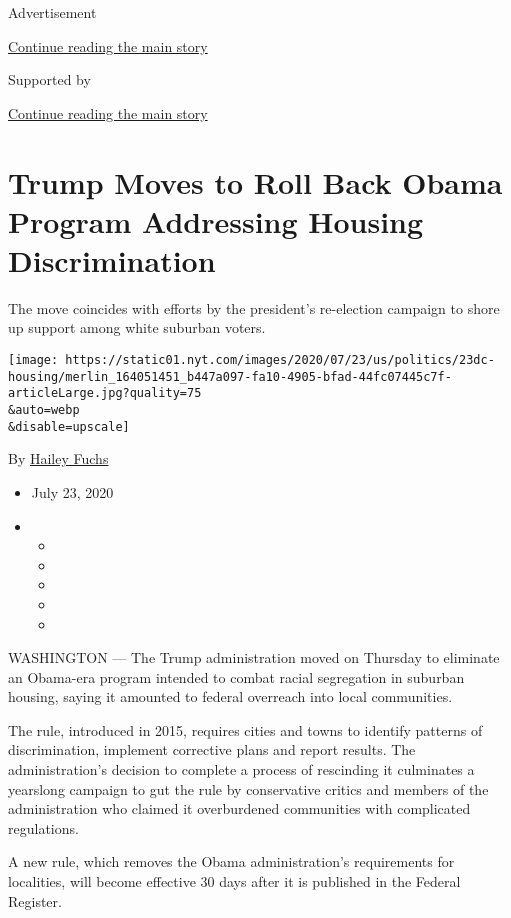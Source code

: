 Advertisement

\protect\hyperlink{after-top}{Continue reading the main story}

Supported by

\protect\hyperlink{after-sponsor}{Continue reading the main story}

\hypertarget{trump-moves-to-roll-back-obama-program-addressing-housing-discrimination}{%
\section{Trump Moves to Roll Back Obama Program Addressing Housing
Discrimination}\label{trump-moves-to-roll-back-obama-program-addressing-housing-discrimination}}

The move coincides with efforts by the president's re-election campaign
to shore up support among white suburban voters.

\texttt{[image: https://static01.nyt.com/images/2020/07/23/us/politics/23dc-housing/merlin\_164051451\_b447a097-fa10-4905-bfad-44fc07445c7f-articleLarge.jpg?quality=75\\\&auto=webp\\\&disable=upscale]}

By \href{https://www.nytimes.com/by/hailey-fuchs}{Hailey Fuchs}

\begin{itemize}
\item
  July 23, 2020
\item
  \begin{itemize}
  \item
  \item
  \item
  \item
  \item
  \end{itemize}
\end{itemize}

WASHINGTON --- The Trump administration moved on Thursday to eliminate
an Obama-era program intended to combat racial segregation in suburban
housing, saying it amounted to federal overreach into local communities.

The rule, introduced in 2015, requires cities and towns to identify
patterns of discrimination, implement corrective plans and report
results. The administration's decision to complete a process of
rescinding it culminates a yearslong campaign to gut the rule by
conservative critics and members of the administration who claimed it
overburdened communities with complicated regulations.

A new rule, which removes the Obama administration's requirements for
localities, will become effective 30 days after it is published in the
Federal Register.

